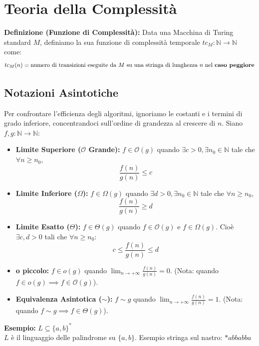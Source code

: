 \newpage

\section{Teoria della Complessità}

\textbf{Definizione (Funzione di Complessità):} Data una Macchina di Turing standard $M$, definiamo la sua funzione di complessità temporale $tc_M : \mathbb{N} \to \mathbb{N}$ come:
$$ tc_M(n) = \text{numero di transizioni eseguite da } M \text{ su una stringa di lunghezza } n \text{ nel \textbf{caso peggiore}} $$

\subsection{Notazioni Asintotiche}
Per confrontare l'efficienza degli algoritmi, ignoriamo le costanti e i termini di grado inferiore, concentrandoci sull'ordine di grandezza al crescere di $n$. Siano $f, g : \mathbb{N} \to \mathbb{N}$:

\begin{itemize}
    \item \textbf{Limite Superiore ($\mathcal{O}$ Grande):} $f \in \mathcal{O}(g)$ quando $\exists c > 0, \exists n_0 \in \mathbb{N}$ tale che $\forall n \ge n_0$, 
    $$ \frac{f(n)}{g(n)} \le c $$
    
    \item \textbf{Limite Inferiore ($\Omega$):} $f \in \Omega(g)$ quando $\exists d > 0, \exists n_0 \in \mathbb{N}$ tale che $\forall n \ge n_0$, 
    $$ \frac{f(n)}{g(n)} \ge d $$
    
    \item \textbf{Limite Esatto ($\Theta$):} $f \in \Theta(g)$ quando $f \in \mathcal{O}(g)$ e $f \in \Omega(g)$. Cioè $\exists c, d > 0$ tali che $\forall n \ge n_0$:
    $$ c \le \frac{f(n)}{g(n)} \le d $$
    
    \item \textbf{o piccolo:} $f \in o(g)$ quando $\lim_{n \to +\infty} \frac{f(n)}{g(n)} = 0$. (Nota: quando $f \in o(g) \implies f \in \mathcal{O}(g)$).
    
    \item \textbf{Equivalenza Asintotica ($\sim$):} $f \sim g$ quando $\lim_{n \to +\infty} \frac{f(n)}{g(n)} = 1$. (Nota: quando $f \sim g \implies f \in \Theta(g)$).
\end{itemize}

\vspace{0.4cm}
\textbf{Esempio:} $L \subseteq \{a,b\}^*$ \\
$L$ è il linguaggio delle palindrome su $\{a,b\}$. Esempio stringa sul nastro: $\ast a b b a b b a$


